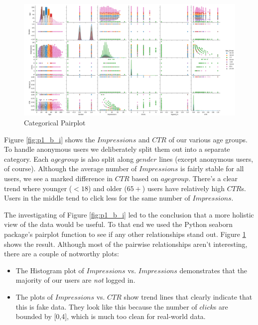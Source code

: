 \documentclass[12pt]{article}
\begin{document}
\begin{enumerate}[leftmargin=\labelsep]
  \begin{figure}[htb]
    \begin{center}
      \includegraphics[width=\textwidth]{media/p1_b_iii.png}
    \end{center}
    \caption{Categorical Pairplot}
    \label{fig:p1_b_iii}
  \end{figure}

  Figure \ref{fig:p1_b_i} shows the $Impressions$ and $CTR$ of our various age groups. To handle anonymous users we deliberately
  split them out into a separate category. Each $age group$ is also split along $gender$ lines (except anonymous users, of course).
  Although the average number of $Impressions$ is fairly stable for all users, we see a marked difference in $CTR$ based on $age
  group$. There's a clear trend where younger ($<18$) and older ($65+$) users have relatively high $CTR$s. Users in the middle
  tend to click less for the same number of $Impressions$.

  The investigating of Figure \ref{fig:p1_b_i} led to the conclusion that a more holistic view of the data would be useful.
  To that end we used the Python seaborn package's pairplot function to see if any other relationships stand out. Figure \ref{fig:p1_b_iii}
  shows the result. Although most of the pairwise relationships aren't interesting, there are a couple of notworthy plots:
  \begin{itemize}
    \item The Histogram plot of $Impressions$ vs. $Impressions$ demonstrates that the majority of our users are \textit{not} logged in.
    \item The plots of $Impressions$ vs. $CTR$ show trend lines that clearly indicate that this is fake data. They look like this because
      the number of $click$s are bounded by [0,4], which is much too clean for real-world data.
  \end{itemize}


\end{enumerate}
\end{document}
